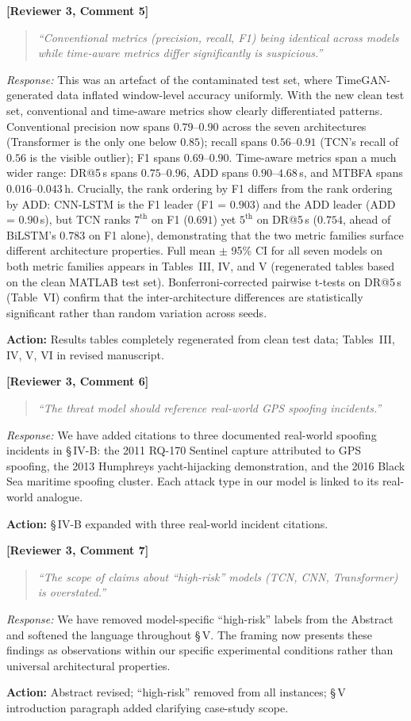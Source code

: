 \documentclass[11pt, a4paper]{article}
\newcommand{\reviewer}[2]{\medskip\noindent\textbf{\textcolor{revcolor}{[Reviewer #1, Comment #2]}}\par}
\newcommand{\response}[1]{\noindent\textit{Response:} #1\par}
\newcommand{\action}[1]{\noindent\textcolor{actcolor}{\textbf{Action:} #1}\smallskip\par}
\newcommand{\quoterev}[1]{\begin{quote}\textit{``#1''}\end{quote}}
\begin{document}
\reviewer{3}{5}
\quoterev{Conventional metrics (precision, recall, F1) being identical across
  models while time-aware metrics differ significantly is suspicious.}
\response{%
  This was an artefact of the contaminated test set, where TimeGAN-generated
  data inflated window-level accuracy uniformly. With the new clean test set,
  conventional and time-aware metrics show clearly differentiated patterns.
  Conventional precision now spans $0.79$--$0.90$ across the seven
  architectures (Transformer is the only one below $0.85$); recall spans
  $0.56$--$0.91$ (TCN's recall of $0.56$ is the visible outlier);
  F1 spans $0.69$--$0.90$. Time-aware metrics span a much wider range:
  DR@5\,s spans $0.75$--$0.96$, ADD spans $0.90$--$4.68$\,s, and MTBFA
  spans $0.016$--$0.043$\,h. Crucially, the rank ordering by F1 differs
  from the rank ordering by ADD: CNN-LSTM is the F1 leader
  (F1 = $0.903$) and the ADD leader (ADD = $0.90$\,s), but TCN ranks
  $7^{\mathrm{th}}$ on F1 ($0.691$) yet $5^{\mathrm{th}}$ on DR@5\,s
  ($0.754$, ahead of BiLSTM's $0.783$ on F1 alone), demonstrating that
  the two metric families surface different architecture properties.
  Full mean $\pm$ 95\% CI for all seven models on both metric families
  appears in Tables~III, IV, and V (regenerated tables based on the
  clean MATLAB test set).
  Bonferroni-corrected pairwise t-tests on DR@5\,s (Table~VI) confirm
  that the inter-architecture differences are statistically significant
  rather than random variation across seeds.}
\action{Results tables completely regenerated from clean test data;
  Tables~III, IV, V, VI in revised manuscript.}

\reviewer{3}{6}
\quoterev{The threat model should reference real-world GPS spoofing incidents.}
\response{%
  We have added citations to three documented real-world spoofing incidents
  in \S\,IV-B: the 2011 RQ-170 Sentinel capture attributed to GPS spoofing,
  the 2013 Humphreys yacht-hijacking demonstration, and the 2016 Black Sea
  maritime spoofing cluster. Each attack type in our model is linked to
  its real-world analogue.}
\action{\S\,IV-B expanded with three real-world incident citations.}

\reviewer{3}{7}
\quoterev{The scope of claims about ``high-risk'' models (TCN, CNN, Transformer)
  is overstated.}
\response{%
  We have removed model-specific ``high-risk'' labels from the Abstract and
  softened the language throughout \S\,V. The framing now presents these
  findings as observations within our specific experimental conditions rather
  than universal architectural properties.}
\action{Abstract revised; ``high-risk'' removed from all instances; \S\,V
  introduction paragraph added clarifying case-study scope.}
\end{document}
